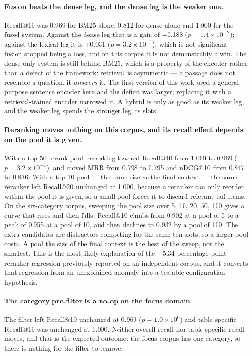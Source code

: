 \documentclass[preprint,3p,times]{elsarticle}
\begin{document}
\paragraph{Fusion beats the dense leg, and the dense leg is the weaker one.}
Recall@10 was 0.969 for BM25 alone, 0.812 for dense
alone and 1.000 for the fused system. Against the dense leg that
is a gain of +0.188 ($p=1.4\!\times\!10^{-2}$); against the lexical leg it is
+0.031 ($p=3.2\!\times\!10^{-1}$), which is not significant --- fusion stopped
being a loss, and on this corpus it is not demonstrably a win.
The dense-only system is still behind BM25, which is a property of the encoder rather than a defect of the framework: retrieval is asymmetric --- a passage does not resemble a question, it \emph{answers} it. The first version of this work used a general-purpose sentence encoder here and the deficit was larger; replacing it with a retrieval-trained encoder narrowed it. A hybrid is only as good as its weaker leg, and the weaker leg spends the stronger leg its slots.

\paragraph{Reranking moves nothing on this corpus, and its recall effect depends on the pool it is given.}
With a top-50 rerank pool, reranking lowered Recall@10 from 1.000 to 0.969 ($p=3.2\!\times\!10^{-1}$),
and moved MRR from 0.798 to 0.795 and nDCG@10 from
0.847 to 0.836. With a top-10 pool --- the same size as
the final context --- the same reranker left Recall@20 unchanged at 1.000, because a reranker can only
reorder within the pool it is given, so a small pool forces it to discard
relevant tail items. On the six-category corpus, sweeping the pool size over 5, 10, 20, 50, 100 gives a curve that rises and then falls: Recall@10 climbs from 0.902 at a pool of 5 to a peak of 0.955 at a pool of 10, and then declines to 0.932 by a pool of 100. The extra candidates are distractors competing for the same ten slots, so a larger pool costs. A pool the size of the final context is the best of the sweep, not the smallest.
This is the most likely explanation of the $-5.34$ percentage-point reranker
regression previously reported on an independent corpus, and it converts that
regression from an unexplained anomaly into a testable configuration hypothesis.

\paragraph{The category pre-filter is a no-op on the focus domain.} The filter left Recall@10 unchanged at 0.969 ($p=1.0\!\times\!10^{0}$)
and table-specific Recall@10 was unchanged at 1.000. Neither overall recall nor table-specific recall moves, and that is the expected outcome: the focus corpus has one category, so there is nothing for the filter to remove.
\end{document}
